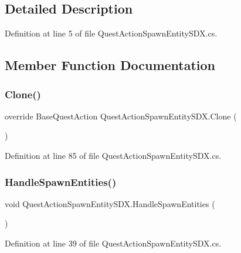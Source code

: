 \subsection{Detailed Description}


Definition at line 5 of file Quest\+Action\+Spawn\+Entity\+S\+D\+X.\+cs.



\subsection{Member Function Documentation}
\mbox{\label{class_quest_action_spawn_entity_s_d_x_a6570686aa37e4c410fd434769dae7753}} 
\subsubsection{\texorpdfstring{Clone()}{Clone()}}
{\footnotesize\ttfamily override Base\+Quest\+Action Quest\+Action\+Spawn\+Entity\+S\+D\+X.\+Clone (\begin{DoxyParamCaption}{ }\end{DoxyParamCaption})}



Definition at line 85 of file Quest\+Action\+Spawn\+Entity\+S\+D\+X.\+cs.

\mbox{\label{class_quest_action_spawn_entity_s_d_x_af16565ac6f58bf902a6b0168b903a48d}} 
\subsubsection{\texorpdfstring{HandleSpawnEntities()}{HandleSpawnEntities()}}
{\footnotesize\ttfamily void Quest\+Action\+Spawn\+Entity\+S\+D\+X.\+Handle\+Spawn\+Entities (\begin{DoxyParamCaption}{ }\end{DoxyParamCaption})}



Definition at line 39 of file Quest\+Action\+Spawn\+Entity\+S\+D\+X.\+cs.

